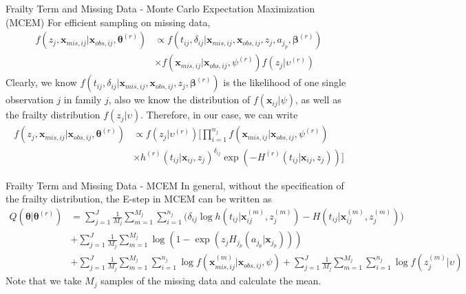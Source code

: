 \documentclass [aspectratio=169]{beamer}
\begin{document}
\begin{frame}{Frailty Term and Missing Data - Monte Carlo Expectation Maximization (MCEM)}
    For efficient sampling on missing data, 
    \begin{align} 
        f(z_j, \mathbf{x}_{mis,ij}|\mathbf{x}_{obs,ij}, \boldsymbol{\theta}^{(r)})&\propto f(t_{ij}, \delta_{ij}|\mathbf{x}_{mis,ij}, \mathbf{x}_{obs,ij}, z_j, a_{j_p}, \boldsymbol{\beta}^{(r)})\\
        &\times f(\mathbf{x}_{mis,ij}|\mathbf{x}_{obs,ij}, \psi^{(r)})f(z_j|\upsilon^{(r)})
    \end{align}
    Clearly, we know $f(t_{ij}, \delta_{ij}|\mathbf{x}_{mis,ij}, \mathbf{x}_{obs,ij}, z_j, \boldsymbol{\beta}^{(r)})$ is the likelihood of one single observation $j$ in family $j$, also we know the distribution of $f(\mathbf{x}_{ij}|\psi)$, as well as the frailty distribution $f(z_j|\upsilon)$. 
    Therefore, in our case, we can write 
    \begin{align} 
        f(z_j, \mathbf{x}_{mis,ij}|\mathbf{x}_{obs,ij}, \boldsymbol{\theta}^{(r)})&\propto f(z_j|\upsilon^{(r)})\Big [ \prod_{i=1}^{n_j} f(\mathbf{x}_{mis,ij}|\mathbf{x}_{obs,ij}, \psi^{(r)})\\ 
        &\times h^{(r)}(t_{ij}|\mathbf{x}_{ij}, z_j)^{\delta_{ij}}\exp (-H^{(r)}(t_{ij}|\mathbf{x}_{ij}, z_j))\Big ]
    \end{align}
\end{frame}

\begin{frame}{Frailty Term and Missing Data - MCEM}
    In general, without the specification of the frailty distribution, the E-step in MCEM can be written as 
    \begin{align} 
        Q(\boldsymbol{\theta}|\boldsymbol{\theta}^{(r)})
        &=\sum_{j=1}^J \frac{1}{M_j}\sum_{m=1}^{M_j}\sum_{i=1}^{n_j} \Big ( \delta_{ij}\log h(t_{ij}|\mathbf{x}_{ij}^{(m)}, z_j^{(m)}) - H(t_{ij}|\mathbf{x}_{ij}^{(m)}, z_j^{(m)})\Big )\\
        &+\sum_{j=1}^J\frac{1}{M_j}\sum_{m=1}^{M_j}\log(1- \exp(z_j H_{j_p}(a_{j_p}|\mathbf{x}_{j_p})))\\
        &+\sum_{j=1}^J\frac{1}{M_j}\sum_{m=1}^{M_j}\sum_{i=1}^{n_j}\log f(\mathbf{x}_{mis,ij}^{(m)}|\mathbf{x}_{obs,ij}, \psi)+\sum_{j=1}^J\frac{1}{M_j}\sum_{m=1}^{M_j}\sum_{i=1}^{n_j}\log f(z_j^{(m)}|\upsilon)
    \end{align} 
    Note that we take $M_j$ samples of the missing data and calculate the mean. 
\end{frame}
\end{document}
